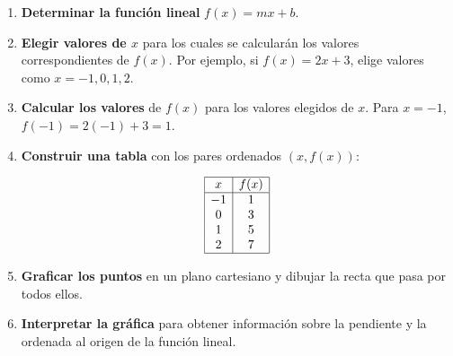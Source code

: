 \begin{enumerate}
    \item \textbf{Determinar la función lineal} \(f(x) = mx + b\).
    
    \item \textbf{Elegir valores de \(x\)} para los cuales se calcularán los valores correspondientes de \(f(x)\). Por ejemplo, si \(f(x) = 2x + 3\), elige valores como \(x = -1, 0, 1, 2\).
    
    \item \textbf{Calcular los valores} de \(f(x)\) para los valores elegidos de \(x\). Para \(x = -1\), \(f(-1) = 2(-1) + 3 = 1\).
    
    \item \textbf{Construir una tabla} con los pares ordenados \((x, f(x))\):

    \[
    \begin{array}{|c|c|}
    \hline
    x & f(x) \\
    \hline
    -1 & 1 \\
    0 & 3 \\
    1 & 5 \\
    2 & 7 \\
    \hline
    \end{array}
    \]

    \item \textbf{Graficar los puntos} en un plano cartesiano y dibujar la recta que pasa por todos ellos.
    
    \item \textbf{Interpretar la gráfica} para obtener información sobre la pendiente y la ordenada al origen de la función lineal.
\end{enumerate}

\begin{center}
    \end{center}






